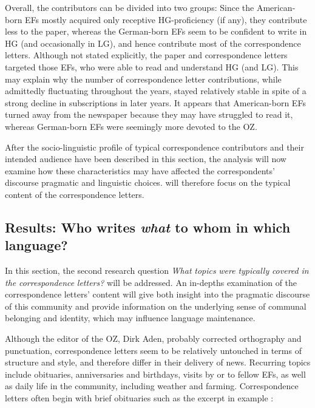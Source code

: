 \documentclass[output=paper]{langsci/langscibook}
\begin{document}
Overall, the contributors can be divided into two groups:  Since the American-born EFs mostly acquired only receptive HG-proficiency (if any), they contribute less to the paper, whereas  the German-born EFs seem to be confident to write in HG (and occasionally in LG), and hence contribute most of the correspondence letters. Although not stated explicitly, the paper and correspondence letters targeted those EFs, who were able to read and understand HG (and LG). This may explain why the number of correspondence letter contributions, while admittedly fluctuating throughout the years, stayed relatively stable in spite of a strong decline in subscriptions in later years. It appears that American-born EFs turned away from the newspaper because they may have struggled to read it, whereas German-born EFs were seemingly more devoted to the OZ. 

After the socio-linguistic profile of typical correspondence contributors and their intended audience have been described in this section, the analysis will now examine how these characteristics may have affected the correspondents’ discourse pragmatic and linguistic choices.  will therefore focus on the typical content of the correspondence letters. 

\subsection{Results: Who writes \textit{what} to whom in which language?} %
\label{sec:rocker:4.2}

In this section, the second research question \textit{What} \textit{topics} \textit{were} \textit{typically} \textit{covered} \textit{in} \textit{the} \textit{correspondence} \textit{letters?} will be addressed. An in-depths examination of the correspondence letters’ content will give both insight into the pragmatic discourse of this community and provide information on the underlying sense of communal belonging and identity, which may influence language maintenance. 

Although the editor of the OZ, Dirk Aden, probably corrected orthography and punctuation, correspondence letters seem to be relatively untouched in terms of structure and style, and therefore differ in their delivery of news. Recurring topics include obituaries, anniversaries and birthdays, visits by or to fellow EFs, as well as daily life in the community, including weather and farming. Correspondence letters often begin with brief obituaries such as the excerpt in example :
\end{document}
